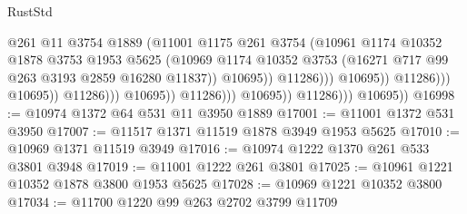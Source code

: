 \begin{lexlean}{RustStd}
\begin{coremodule}
                                                      @261
                                                      @11
                                                      @3754
                                                      @1889
                                                      (@11001
                                                        @1175
                                                        @261
                                                        @3754
                                                        (@10961
                                                          @1174
                                                          @10352
                                                          @1878
                                                          @3753
                                                          @1953
                                                          @5625
                                                          (@10969
                                                            @1174
                                                            @10352
                                                            @3753
                                                            (@16271
                                                              @717
                                                              @99
                                                              @263
                                                              @3193
                                                              @2859
                                                              @16280
                                                              @11837))
                                                          @10695))
                                                      @11286)))
                                                @10695))
                                            @11286)))
                                      @10695))
                                  @11286)))
                            @10695))
                        @11286)))
                  @10695))
              @11286)))
        @10695))
@16998 := @10974 @1372 @64 @531 @11 @3950 @1889
@17001 := @11001 @1372 @531 @3950
@17007 := @11517 @1371 @11519 @1878 @3949 @1953 @5625
@17010 := @10969 @1371 @11519 @3949
@17016 := @10974 @1222 @1370 @261 @533 @3801 @3948
@17019 := @11001 @1222 @261 @3801
@17025 := @10961 @1221 @10352 @1878 @3800 @1953 @5625
@17028 := @10969 @1221 @10352 @3800
@17034 := @11700 @1220 @99 @263 @2702 @3799 @11709

\end{coremodule}
\end{lexlean}
